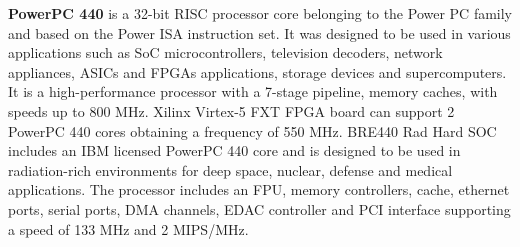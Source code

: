 \hspace{0.5cm}  \textbf{PowerPC 440} is a 32-bit RISC processor core belonging to the Power PC family and
based on the Power ISA instruction set. It was designed to be used in various applications
such as SoC microcontrollers, television decoders, network appliances, ASICs and FPGAs
applications, storage devices and supercomputers. It is a high-performance processor with a
7-stage pipeline, memory caches, with speeds up to 800 MHz. Xilinx Virtex-5 FXT FPGA
board can support 2 PowerPC 440 cores obtaining a frequency of 550 MHz. BRE440 Rad
Hard SOC includes an IBM licensed PowerPC 440 core and is designed to be used in
radiation-rich environments for deep space, nuclear, defense and medical applications. The
processor includes an FPU, memory controllers, cache, ethernet ports, serial ports, DMA
channels, EDAC controller and PCI interface supporting a speed of 133 MHz and 2
MIPS/MHz.